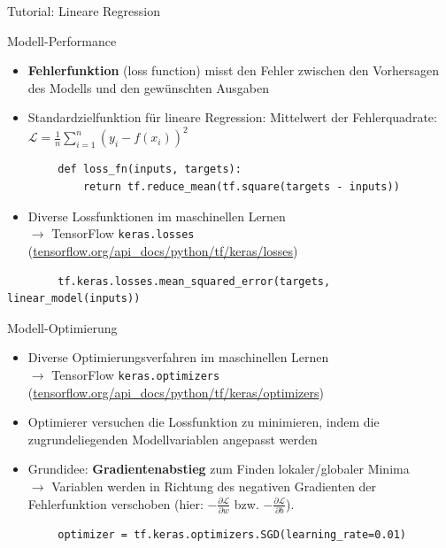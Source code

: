 \documentclass[utf8, smaller, c]{beamer}
\renewcommand{\tt}[1]{{\texttt{#1}}}
\begin{document}
\begin{frame}{Tutorial: Lineare Regression}
	\begin{block}{Modell-Performance}
	\begin{itemize}
		\item \textbf{Fehlerfunktion} (loss function) misst den Fehler zwischen den Vorhersagen des Modells und den gewünschten Ausgaben
		\item Standardzielfunktion für lineare Regression: Mittelwert der Fehlerquadrate: $\mathcal{L} = \frac{1}{n}\sum_{i=1}^n (y_i - f(x_i))^2$
	\end{itemize}
	\begin{lstlisting}
	    def loss_fn(inputs, targets):
            return tf.reduce_mean(tf.square(targets - inputs))
	\end{lstlisting}
	\begin{itemize}
	    \item Diverse Lossfunktionen im maschinellen Lernen \\$\rightarrow$ TensorFlow \tt{keras.losses} \\({\footnotesize\url{tensorflow.org/api_docs/python/tf/keras/losses}})
	\end{itemize}
	\begin{lstlisting}
	    tf.keras.losses.mean_squared_error(targets, linear_model(inputs))
	\end{lstlisting}
	\end{block}
	
	\framebreak
	
	\begin{block}{Modell-Optimierung}
	\begin{itemize}
		\item Diverse Optimierungsverfahren im maschinellen Lernen \\$\rightarrow$ TensorFlow \tt{keras.optimizers} \\({\footnotesize\url{tensorflow.org/api_docs/python/tf/keras/optimizers}})
		\item Optimierer versuchen die Lossfunktion zu minimieren, indem die zugrundeliegenden Modellvariablen angepasst werden
		\item Grundidee: \textbf{Gradientenabstieg} zum Finden lokaler/globaler Minima\\$\rightarrow$ Variablen werden in Richtung des negativen Gradienten der Fehlerfunktion verschoben (hier: $-\frac{\partial\mathcal{L}}{\partial w}$ bzw. $-\frac{\partial\mathcal{L}}{\partial b}$).
	\end{itemize}
	\begin{lstlisting}
	    optimizer = tf.keras.optimizers.SGD(learning_rate=0.01)
	\end{lstlisting}
	\end{block}
	

\end{frame}
\end{document}
